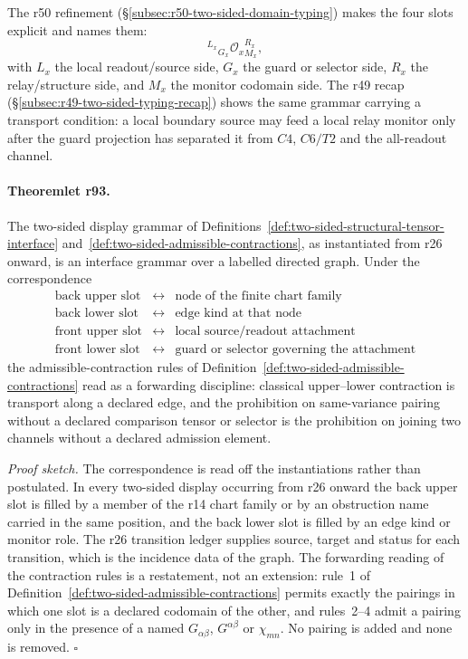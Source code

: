 The r50 refinement (\S\ref{subsec:r50-two-sided-domain-typing}) makes the four slots explicit
and names them:
\[
{}^{L_x}{}_{G_x}\mathcal O_x{}^{R_x}_{M_x},
\]
with \(L_x\) the local readout/source side, \(G_x\) the guard or selector side, \(R_x\) the
relay/structure side, and \(M_x\) the monitor codomain side.  The r49 recap
(\S\ref{subsec:r49-two-sided-typing-recap}) shows the same grammar carrying a transport
condition: a local boundary source may feed a local relay monitor only after the guard
projection has separated it from \(C4\), \(C6/T2\) and the all-readout channel.

\paragraph{Theoremlet r93.}
The two-sided display grammar of
Definitions~\ref{def:two-sided-structural-tensor-interface}
and~\ref{def:two-sided-admissible-contractions}, as instantiated from r26 onward, is an
interface grammar over a labelled directed graph.  Under the correspondence
\[
\begin{array}{lcl}
\text{back upper slot} &\longleftrightarrow& \text{node of the finite chart family}\\
\text{back lower slot} &\longleftrightarrow& \text{edge kind at that node}\\
\text{front upper slot} &\longleftrightarrow& \text{local source/readout attachment}\\
\text{front lower slot} &\longleftrightarrow& \text{guard or selector governing the attachment}
\end{array}
\]
the admissible-contraction rules of
Definition~\ref{def:two-sided-admissible-contractions} read as a forwarding discipline:
classical upper--lower contraction is transport along a declared edge, and the prohibition on
same-variance pairing without a declared comparison tensor or selector is the prohibition on
joining two channels without a declared admission element.

\emph{Proof sketch.}
The correspondence is read off the instantiations rather than postulated.  In every
two-sided display occurring from r26 onward the back upper slot is filled by a member of the
r14 chart family or by an obstruction name carried in the same position, and the back lower
slot is filled by an edge kind or monitor role.  The r26 transition ledger supplies source,
target and status for each transition, which is the incidence data of the graph.  The
forwarding reading of the contraction rules is a restatement, not an extension: rule~1 of
Definition~\ref{def:two-sided-admissible-contractions} permits exactly the pairings in which
one slot is a declared codomain of the other, and rules~2--4 admit a pairing only in the
presence of a named \(G_{\alpha\beta}\), \(G^{\alpha\beta}\) or \(\chi_{mn}\).  No pairing is
added and none is removed.  \(\square\)

